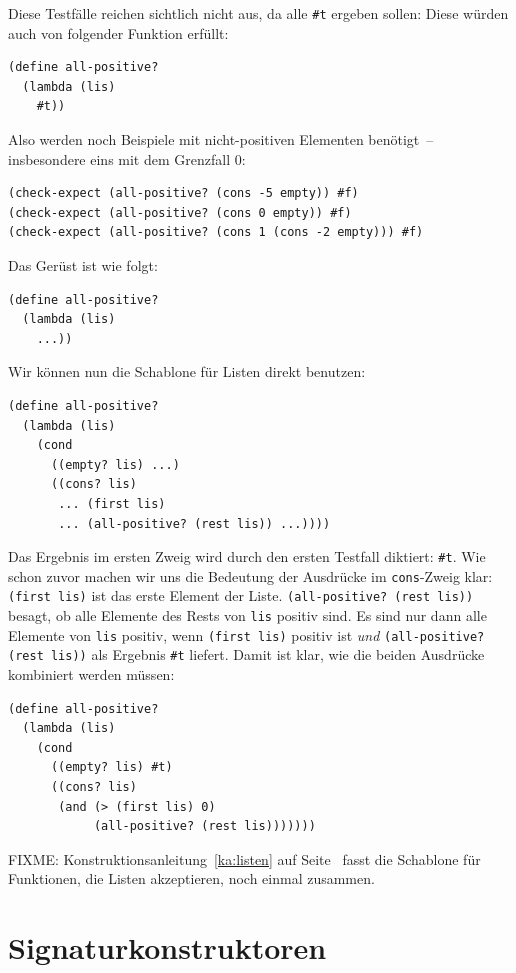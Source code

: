 Diese Testfälle reichen sichtlich nicht aus, da alle \verb|#t| ergeben
sollen: Diese würden auch von folgender Funktion erfüllt:
%
\begin{verbatim}
(define all-positive?
  (lambda (lis)
    #t))
\end{verbatim}
%
Also werden noch Beispiele mit nicht-positiven Elementen benötigt~--
insbesondere eins mit dem Grenzfall $0$:
\begin{verbatim}
(check-expect (all-positive? (cons -5 empty)) #f)
(check-expect (all-positive? (cons 0 empty)) #f)
(check-expect (all-positive? (cons 1 (cons -2 empty))) #f)
\end{verbatim}
%
Das Gerüst ist wie folgt:
%
\begin{verbatim}
(define all-positive?
  (lambda (lis)
    ...))
\end{verbatim}
%
Wir können nun die Schablone für Listen direkt benutzen:
%
\begin{verbatim}
(define all-positive?
  (lambda (lis)
    (cond
      ((empty? lis) ...)
      ((cons? lis)
       ... (first lis)
       ... (all-positive? (rest lis)) ...))))
\end{verbatim}
%
Das Ergebnis im ersten Zweig wird durch den ersten Testfall diktiert:
\verb|#t|.  Wie schon zuvor machen wir uns die Bedeutung der
Ausdrücke im \texttt{cons}-Zweig klar:
\texttt{(first lis)} ist das erste Element der Liste.
\texttt{(all-positive? (rest lis))} besagt, ob alle Elemente
des Rests von \texttt{lis} positiv sind.  Es sind nur dann alle
Elemente von \texttt{lis} positiv, wenn \texttt{(first lis)}
positiv ist \emph{und} \texttt{(all-positive? (rest lis))} als Ergebnis
\verb|#t| liefert.  Damit ist klar, wie die beiden Ausdrücke
kombiniert werden müssen:
%
\begin{verbatim}
(define all-positive?
  (lambda (lis)
    (cond
      ((empty? lis) #t)
      ((cons? lis)
       (and (> (first lis) 0)
            (all-positive? (rest lis)))))))
\end{verbatim}
%
FIXME: Konstruktionsanleitung~\ref{ka:listen} auf Seite~\pageref{ka:listen}
fasst die Schablone für Funktionen, die Listen akzeptieren, noch einmal
zusammen. %

\section{Signaturkonstruktoren}

